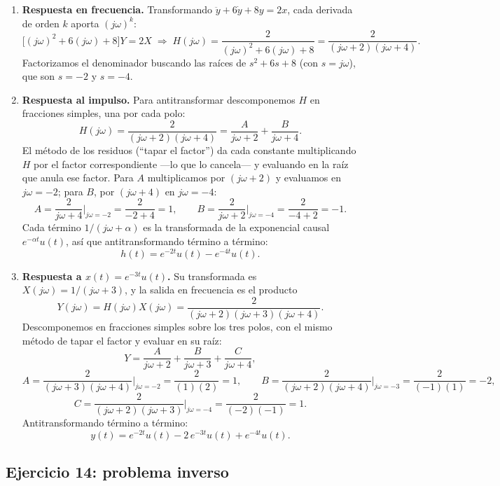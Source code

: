 \documentclass[10pt,a4paper]{article}
\begin{document}
	\begin{enumerate}[label=\textbf{\alph*)}]
		\item \textbf{Respuesta en frecuencia.} Transformando $\ddot{y}+6\dot{y}+8y=2x$, cada derivada de orden $k$ aporta $(j\omega)^k$:
		\[
			\big[(j\omega)^2+6(j\omega)+8\big]Y = 2X
			\;\Rightarrow\;
			\boxed{H(j\omega)=\frac{2}{(j\omega)^2+6(j\omega)+8}=\frac{2}{(j\omega+2)(j\omega+4)}.}
		\]
		Factorizamos el denominador buscando las raíces de $s^2+6s+8$ (con $s=j\omega$), que son $s=-2$ y $s=-4$.

		\item \textbf{Respuesta al impulso.} Para antitransformar descomponemos $H$ en fracciones simples, una por cada polo:
		\[
			H(j\omega)=\frac{2}{(j\omega+2)(j\omega+4)}=\frac{A}{j\omega+2}+\frac{B}{j\omega+4}.
		\]
		El método de los residuos (``tapar el factor'') da cada constante multiplicando $H$ por el factor correspondiente ---lo que lo cancela--- y evaluando en la raíz que anula ese factor. Para $A$ multiplicamos por $(j\omega+2)$ y evaluamos en $j\omega=-2$; para $B$, por $(j\omega+4)$ en $j\omega=-4$:
		\[
			A=\frac{2}{j\omega+4}\bigg|_{j\omega=-2}=\frac{2}{-2+4}=1,
			\qquad
			B=\frac{2}{j\omega+2}\bigg|_{j\omega=-4}=\frac{2}{-4+2}=-1.
		\]
		Cada término $1/(j\omega+\alpha)$ es la transformada de la exponencial causal $e^{-\alpha t}u(t)$, así que antitransformando término a término:
		\[
			\boxed{h(t)=e^{-2t}u(t)-e^{-4t}u(t).}
		\]

		\item \textbf{Respuesta a $x(t)=e^{-3t}u(t)$.} Su transformada es $X(j\omega)=1/(j\omega+3)$, y la salida en frecuencia es el producto
		\[
			Y(j\omega)=H(j\omega)X(j\omega)=\frac{2}{(j\omega+2)(j\omega+3)(j\omega+4)}.
		\]
		Descomponemos en fracciones simples sobre los tres polos, con el mismo método de tapar el factor y evaluar en su raíz:
		\[
			Y=\frac{A}{j\omega+2}+\frac{B}{j\omega+3}+\frac{C}{j\omega+4},
		\]
		\[
			A=\frac{2}{(j\omega+3)(j\omega+4)}\bigg|_{j\omega=-2}=\frac{2}{(1)(2)}=1,
			\qquad
			B=\frac{2}{(j\omega+2)(j\omega+4)}\bigg|_{j\omega=-3}=\frac{2}{(-1)(1)}=-2,
		\]
		\[
			C=\frac{2}{(j\omega+2)(j\omega+3)}\bigg|_{j\omega=-4}=\frac{2}{(-2)(-1)}=1.
		\]
		Antitransformando término a término:
		\[
			\boxed{y(t)=e^{-2t}u(t)-2\,e^{-3t}u(t)+e^{-4t}u(t).}
		\]
	\end{enumerate}

	\subsection*{Ejercicio 14: problema inverso}
\end{document}
